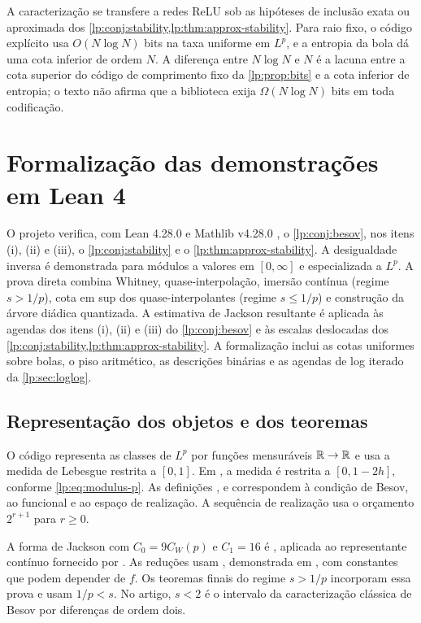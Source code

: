 \documentclass[12pt,a4paper]{article}
\begin{document}
A caracterização se transfere a redes ReLU sob as hipóteses de inclusão exata ou aproximada dos \cref{lp:conj:stability,lp:thm:approx-stability}. Para raio fixo, o código explícito usa $O(N\log N)$ bits na taxa uniforme em $L^p$, e a entropia da bola dá uma cota inferior de ordem $N$. A diferença entre $N\log N$ e $N$ é a lacuna entre a cota superior do código de comprimento fixo da \cref{lp:prop:bits} e a cota inferior de entropia; o texto não afirma que a biblioteca exija $\Omega(N\log N)$ bits em toda codificação.

\ifbesovabnt
\articlereferences
\fi

\articleappendix
\section{Formalização das demonstrações em Lean 4}
\label{lp:sec:lean}

O projeto  verifica, com Lean 4.28.0 e Mathlib v4.28.0 \citep{lp-mathlib,lp-lean4}, o \cref{lp:conj:besov}, nos itens (i), (ii) e (iii), o \cref{lp:conj:stability} e o \cref{lp:thm:approx-stability}. A desigualdade inversa é demonstrada para módulos a valores em $[0,\infty]$ e especializada a $L^p$. A prova direta combina Whitney, quase-interpolação, imersão contínua (regime $s>1/p$), cota em sup dos quase-interpolantes (regime $s\le1/p$) e construção da árvore diádica quantizada. A estimativa de Jackson resultante é aplicada às agendas dos itens (i), (ii) e (iii) do \cref{lp:conj:besov} e às escalas deslocadas dos \cref{lp:conj:stability,lp:thm:approx-stability}. A formalização inclui as cotas uniformes sobre bolas, o piso aritmético, as descrições binárias e as agendas de log iterado da \cref{lp:sec:loglog}.

\subsection{Representação dos objetos e dos teoremas}
\label{lp:sec:fidelity}

O código representa as classes de $L^p$ por funções mensuráveis $\mathbb R\to\mathbb R$ e usa a medida de Lebesgue restrita a $[0,1]$. Em , a medida é restrita a $[0,1-2h]$, conforme \eqref{lp:eq:modulus-p}. As definições ,  e  correspondem à condição de Besov, ao funcional e ao espaço de realização. A sequência de realização usa o orçamento $2^{r+1}$ para $r\ge0$.

A forma de Jackson com $C_0=9C_W(p)$ e $C_1=16$ é , aplicada ao representante contínuo fornecido por . As reduções usam , demonstrada em , com constantes que podem depender de $f$. Os teoremas finais do regime $s>1/p$ incorporam essa prova e usam $1/p<s$. No artigo, $s<2$ é o intervalo da caracterização clássica de Besov por diferenças de ordem dois.
\end{document}
